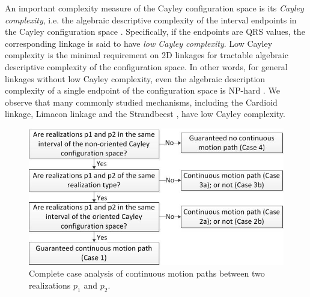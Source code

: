 \documentclass[prodmode,acmtoms]{acmsmall}
\begin{document}
An important complexity measure of the Cayley configuration space 
is its \emph{Cayley complexity}, i.e. the algebraic descriptive complexity of the interval endpoints 
in the Cayley configuration space \cite[Section 1.2]{Sitharam2011a}.  
Specifically, if the endpoints are QRS values, the corresponding linkage is said to have \emph{low Cayley complexity}.
Low Cayley complexity is the minimal requirement on 2D linkages for tractable algebraic descriptive complexity of the configuration space. 
In other words,
for general linkages without low Cayley complexity,
even the algebraic description complexity of a single endpoint of the configuration space is NP-hard \citep{Sitharam2011a}.
We observe that  many commonly studied mechanisms, including the Cardioid linkage, Limacon linkage and the Strandbeest \citep{jansen2009strandbeest}, have low Cayley complexity.




\begin{figure}[tp]
\begin{center}
\includegraphics[width=.75\linewidth]{img/diagram}
\end{center}
\caption{Complete case analysis of continuous motion paths between two realizations $p_1$ and $p_2$. 
}
\label{fig:diagram}
\end{figure}
\end{document}
